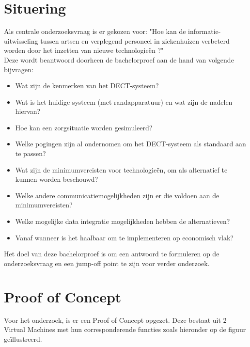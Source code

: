 \documentclass[a0,portrait]{hogent-poster}
\begin{document}
\begin{multicols}{2} %

\section{Situering}

Als centrale onderzoeksvraag is er gekozen voor: "Hoe kan de informatie-uitwisseling tussen artsen en verplegend personeel in ziekenhuizen verbeterd worden door het inzetten van nieuwe technologieën ?" \\
Deze wordt beantwoord doorheen de bachelorproef aan de hand van volgende bijvragen:
\begin{itemize}[noitemsep, topsep=0pt, itemsep=1mm, parsep=0pt]
  \item Wat zijn de kenmerken van het DECT-systeem?
  \item Wat is het huidige systeem (met randapparatuur) en wat zijn de nadelen hiervan?
  \item Hoe kan een zorgsituatie worden gesimuleerd?
  \item Welke pogingen zijn al ondernomen om het DECT-systeem als standaard aan te passen?
  \item Wat zijn de minimumvereisten voor technologieën, om als alternatief te kunnen worden beschouwd?
  \item Welke andere communicatiemogelijkheden zijn er die voldoen aan de minimumvereisten?
  \item Welke mogelijke data integratie mogelijkheden hebben de alternatieven?
  \item Vanaf wanneer is het haalbaar om te implementeren op economisch vlak?
\end{itemize}
Het doel van deze bachelorproef is om een antwoord te formuleren op de onderzoeksvraag en een jump-off point te zijn voor verder onderzoek.

\section{Proof of Concept}
Voor het onderzoek, is er een Proof of Concept opgezet. Deze bestaat uit 2 Virtual Machines met hun corresponderende functies zoals hieronder op de figuur geïllustreerd.



\end{multicols}
\end{document}
